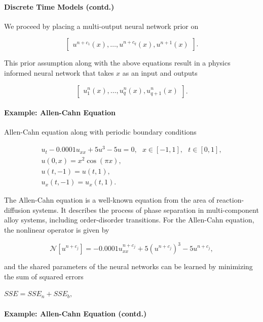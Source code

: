 \documentclass[book.tex]{subfiles}
\begin{document}
\paragraph{Discrete Time Models
(contd.)}\label{discrete-time-models-contd.}

We proceed by placing a multi-output neural network prior on

\[
\begin{bmatrix}
u^{n+c_1}(x), \ldots, u^{n+c_q}(x), u^{n+1}(x)
\end{bmatrix}.
\]

This prior assumption along with the above equations result in a physics
informed neural network that takes $x$ as an input and outputs

\[
\begin{bmatrix}
u^n_1(x), \ldots, u^n_q(x), u^n_{q+1}(x)
\end{bmatrix}.
\]

\paragraph{Example: Allen-Cahn
Equation}\label{example-allen-cahn-equation}

Allen-Cahn equation along with periodic boundary conditions

\[
\begin{array}{l}
u_t - 0.0001 u_{xx} + 5 u^3 - 5 u = 0, \ \ \ x \in [-1,1], \ \ \ t \in [0,1],\\
u(0, x) = x^2 \cos(\pi x),\\
u(t,-1) = u(t,1),\\
u_x(t,-1) = u_x(t,1).
\end{array}
\]

The Allen-Cahn equation is a well-known equation from the area of
reaction-diffusion systems. It describes the process of phase separation
in multi-component alloy systems, including order-disorder transitions.
For the Allen-Cahn equation, the nonlinear operator is given by

\[
\mathcal{N}[u^{n+c_j}] = -0.0001 u^{n+c_j}_{xx} + 5 \left(u^{n+c_j}\right)^3 - 5 u^{n+c_j},
\]

and the shared parameters of the neural networks can be learned by
minimizing the sum of squared errors

$SSE = SSE_n + SSE_b,$

\paragraph{Example: Allen-Cahn Equation
(contd.)}\label{example-allen-cahn-equation-contd.}
\end{document}
